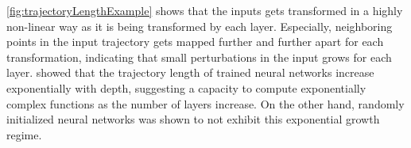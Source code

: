 \autoref{fig:trajectoryLengthExample} shows that the inputs gets transformed in a highly non-linear way as it is being transformed by each layer. Especially, neighboring points in the input trajectory gets mapped further and further apart for each transformation, indicating that small perturbations in the input grows for each layer. \citet{raghu2017expressive} showed that the trajectory length of trained neural networks increase exponentially with depth, suggesting a capacity to compute exponentially complex functions as the number of layers increase. On the other hand, randomly initialized neural networks was shown to not exhibit this exponential growth regime.

